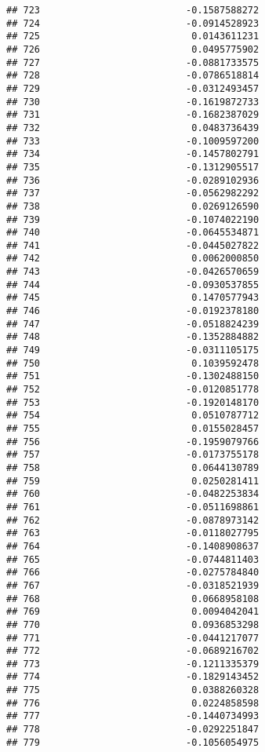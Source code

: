 \documentclass[
]{article}
\begin{document}
\begin{verbatim}
## 723                          -0.1587588272
## 724                          -0.0914528923
## 725                           0.0143611231
## 726                           0.0495775902
## 727                          -0.0881733575
## 728                          -0.0786518814
## 729                          -0.0312493457
## 730                          -0.1619872733
## 731                          -0.1682387029
## 732                           0.0483736439
## 733                          -0.1009597200
## 734                          -0.1457802791
## 735                          -0.1312905517
## 736                          -0.0289102936
## 737                          -0.0562982292
## 738                           0.0269126590
## 739                          -0.1074022190
## 740                          -0.0645534871
## 741                          -0.0445027822
## 742                           0.0062000850
## 743                          -0.0426570659
## 744                          -0.0930537855
## 745                           0.1470577943
## 746                          -0.0192378180
## 747                          -0.0518824239
## 748                          -0.1352884882
## 749                          -0.0311105175
## 750                           0.1039592478
## 751                          -0.1302488150
## 752                          -0.0120851778
## 753                          -0.1920148170
## 754                           0.0510787712
## 755                           0.0155028457
## 756                          -0.1959079766
## 757                          -0.0173755178
## 758                           0.0644130789
## 759                           0.0250281411
## 760                          -0.0482253834
## 761                          -0.0511698861
## 762                          -0.0878973142
## 763                          -0.0118027795
## 764                          -0.1408908637
## 765                          -0.0744811403
## 766                          -0.0275784840
## 767                          -0.0318521939
## 768                           0.0668958108
## 769                           0.0094042041
## 770                           0.0936853298
## 771                          -0.0441217077
## 772                          -0.0689216702
## 773                          -0.1211335379
## 774                          -0.1829143452
## 775                           0.0388260328
## 776                           0.0224858598
## 777                          -0.1440734993
## 778                          -0.0292251847
## 779                          -0.1056054975

\end{verbatim}
\end{document}
